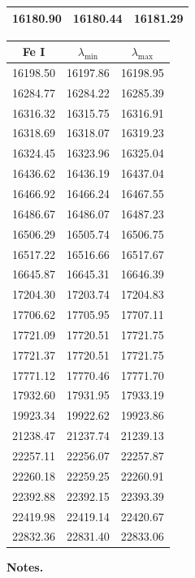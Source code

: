 \begin{table}[h!]
\begin{minipage}[t]{.4\linewidth}
\begin{center}
\begin{tabular}{ccc}
          16180.90 & 16180.44 & 16181.29 \\
          \hline
      \end{tabular}
  \end{center} 
  \end{minipage} 
  \hspace{2.cm}
  \begin{minipage}[t]{.4\linewidth}
  \begin{center}
     \begin{tabular}{ccc}
          \hline
      \hline
      Fe I & $\lambda_{\mathrm{min}}$ & $\lambda_{\mathrm{max}}$ \\
      \hline
      16198.50 & 16197.86 & 16198.95 \\
      16284.77 & 16284.22 & 16285.39 \\
      16316.32 & 16315.75 & 16316.91 \\
      16318.69 & 16318.07 & 16319.23 \\
      16324.45 & 16323.96 & 16325.04 \\
      16436.62 & 16436.19 & 16437.04 \\
      16466.92 & 16466.24 & 16467.55 \\
      16486.67 & 16486.07 & 16487.23 \\
      16506.29 & 16505.74 & 16506.75 \\
      16517.22 & 16516.66 & 16517.67 \\
      16645.87 & 16645.31 & 16646.39 \\
      17204.30 & 17203.74 & 17204.83 \\
      17706.62 & 17705.95 & 17707.11 \\
      17721.09 & 17720.51 & 17721.75 \\
      17721.37 & 17720.51 & 17721.75 \\
      17771.12 & 17770.46 & 17771.70 \\
      17932.60 & 17931.95 & 17933.19 \\
      19923.34 & 19922.62 & 19923.86 \\
      21238.47 & 21237.74 & 21239.13 \\
      22257.11 & 22256.07 & 22257.87 \\
      22260.18 & 22259.25 & 22260.91 \\
      22392.88 & 22392.15 & 22393.39 \\
      22419.98 & 22419.14 & 22420.67 \\
      22832.36 & 22831.40 & 22833.06 \\
          \hline
      \end{tabular}
    \end{center}
  \end{minipage}
  \vspace{0.3cm}
  
  \textbf{Notes.}
  \end{table}


